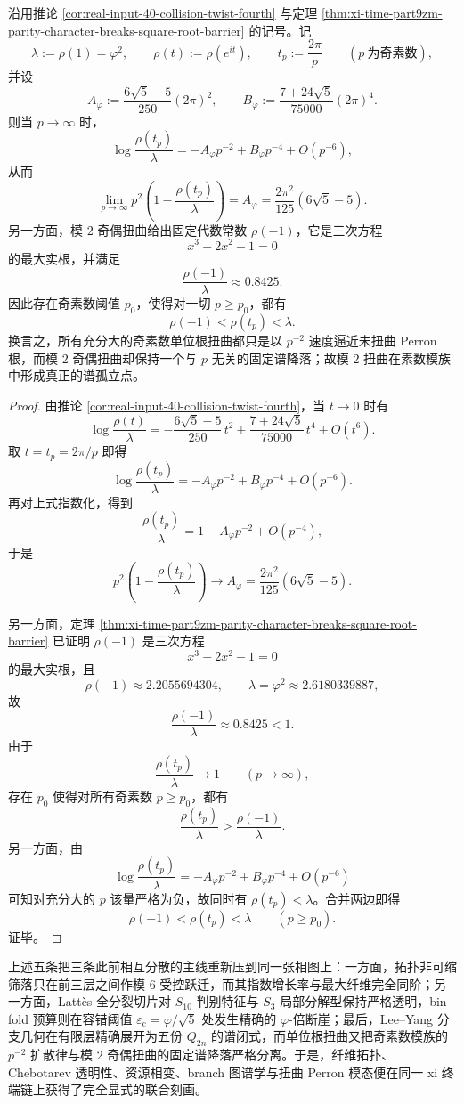 \begin{theorem}\label{thm:xi-time-part9zr-prime-quadratic-law-parity-isolation}
沿用推论 \ref{cor:real-input-40-collision-twist-fourth} 与定理 \ref{thm:xi-time-part9zm-parity-character-breaks-square-root-barrier} 的记号。记
\[
\lambda:=\rho(1)=\varphi^2,
\qquad
\rho(t):=\rho(e^{it}),
\qquad
t_p:=\frac{2\pi}{p}
\qquad
(p\ \text{为奇素数}),
\]
并设
\[
A_\varphi:=\frac{6\sqrt5-5}{250}(2\pi)^2,
\qquad
B_\varphi:=\frac{7+24\sqrt5}{75000}(2\pi)^4.
\]
则当 \(p\to\infty\) 时，
\[
\log\frac{\rho(t_p)}{\lambda}
=
-A_\varphi p^{-2}
+B_\varphi p^{-4}
+O(p^{-6}),
\]
从而
\[
\lim_{p\to\infty}
p^2\left(1-\frac{\rho(t_p)}{\lambda}\right)
=
A_\varphi
=
\frac{2\pi^2}{125}(6\sqrt5-5).
\]
另一方面，模 \(2\) 奇偶扭曲给出固定代数常数 \(\rho(-1)\)，它是三次方程
\[
x^3-2x^2-1=0
\]
的最大实根，并满足
\[
\frac{\rho(-1)}{\lambda}\approx 0.8425.
\]
因此存在奇素数阈值 \(p_0\)，使得对一切 \(p\ge p_0\)，都有
\[
\rho(-1)<\rho(t_p)<\lambda.
\]
换言之，所有充分大的奇素数单位根扭曲都只是以 \(p^{-2}\) 速度逼近未扭曲 Perron 根，而模 \(2\) 奇偶扭曲却保持一个与 \(p\) 无关的固定谱降落；故模 \(2\) 扭曲在素数模族中形成真正的谱孤立点。
\end{theorem}
\begin{proof}
由推论 \ref{cor:real-input-40-collision-twist-fourth}，当 \(t\to 0\) 时有
\[
\log\frac{\rho(t)}{\lambda}
=
-\frac{6\sqrt5-5}{250}\,t^2
+\frac{7+24\sqrt5}{75000}\,t^4
+O(t^6).
\]
取 \(t=t_p=2\pi/p\) 即得
\[
\log\frac{\rho(t_p)}{\lambda}
=
-A_\varphi p^{-2}
+B_\varphi p^{-4}
+O(p^{-6}).
\]
再对上式指数化，得到
\[
\frac{\rho(t_p)}{\lambda}
=
1-A_\varphi p^{-2}+O(p^{-4}),
\]
于是
\[
p^2\left(1-\frac{\rho(t_p)}{\lambda}\right)\longrightarrow A_\varphi
=
\frac{2\pi^2}{125}(6\sqrt5-5).
\]

另一方面，定理 \ref{thm:xi-time-part9zm-parity-character-breaks-square-root-barrier} 已证明 \(\rho(-1)\) 是三次方程
\[
x^3-2x^2-1=0
\]
的最大实根，且
\[
\rho(-1)\approx 2.2055694304,
\qquad
\lambda=\varphi^2\approx 2.6180339887,
\]
故
\[
\frac{\rho(-1)}{\lambda}\approx 0.8425<1.
\]
由于
\[
\frac{\rho(t_p)}{\lambda}\to 1
\qquad
(p\to\infty),
\]
存在 \(p_0\) 使得对所有奇素数 \(p\ge p_0\)，都有
\[
\frac{\rho(t_p)}{\lambda}>\frac{\rho(-1)}{\lambda}.
\]
另一方面，由
\[
\log\frac{\rho(t_p)}{\lambda}
=
-A_\varphi p^{-2}+B_\varphi p^{-4}+O(p^{-6})
\]
可知对充分大的 \(p\) 该量严格为负，故同时有 \(\rho(t_p)<\lambda\)。合并两边即得
\[
\rho(-1)<\rho(t_p)<\lambda
\qquad
(p\ge p_0).
\]
证毕。
\end{proof}

\noindent
上述五条把三条此前相互分散的主线重新压到同一张相图上：一方面，拓扑非可缩筛落只在前三层之间作模 \(6\) 受控跃迁，而其指数增长率与最大纤维完全同阶；另一方面，Latt\`es 全分裂切片对 \(S_{10}\)-判别特征与 \(S_3\)-局部分解型保持严格透明，bin-fold 预算则在容错阈值 \(\varepsilon_{\mathrm c}=\varphi/\sqrt5\) 处发生精确的 \(\varphi\)-倍断崖；最后，Lee--Yang 分支几何在有限层精确展开为五份 \(Q_{2n}\) 的谱闭式，而单位根扭曲又把奇素数模族的 \(p^{-2}\) 扩散律与模 \(2\) 奇偶扭曲的固定谱降落严格分离。于是，纤维拓扑、Chebotarev 透明性、资源相变、branch 图谱学与扭曲 Perron 模态便在同一 xi 终端链上获得了完全显式的联合刻画。

\endinput
